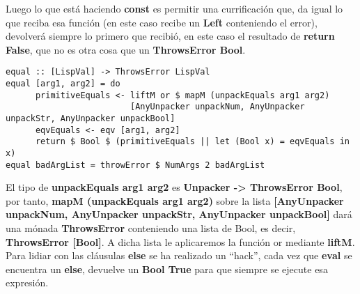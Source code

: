 Luego lo que est\'a haciendo \textbf{const} es permitir una currificaci\'on que, da igual lo que reciba esa funci\'on (en este caso recibe un \textbf{Left} conteniendo el error), devolver\'a siempre lo primero que recibi\'o, en este caso el resultado de \textbf{return False}, que no es otra cosa que un \textbf{ThrowsError Bool}.\\

\begin{minipage}{\linewidth}
\begin{small}
\begin{lstlisting}[frame=single]
equal :: [LispVal] -> ThrowsError LispVal
equal [arg1, arg2] = do
      primitiveEquals <- liftM or $ mapM (unpackEquals arg1 arg2) 
                         [AnyUnpacker unpackNum, AnyUnpacker unpackStr, AnyUnpacker unpackBool]
      eqvEquals <- eqv [arg1, arg2]
      return $ Bool $ (primitiveEquals || let (Bool x) = eqvEquals in x)
equal badArgList = throwError $ NumArgs 2 badArgList
\end{lstlisting}
\end{small}
\end{minipage}

El tipo de \textbf{unpackEquals arg1 arg2} es \textbf{Unpacker -> ThrowsError Bool}, por tanto, \textbf{mapM (unpackEquals arg1 arg2)} sobre la lista \textbf{[AnyUnpacker unpackNum, AnyUnpacker unpackStr, AnyUnpacker unpackBool]} dar\'a una m\'onada \textbf{ThrowsError} conteniendo una lista de Bool, es decir, \textbf{ThrowsError [Bool]}. A dicha lista le aplicaremos la funci\'on or mediante \textbf{liftM}.\\

Para lidiar con las cl\'ausulas \textbf{else} se ha realizado un ``hack'', cada vez que \textbf{eval} se encuentra un \textbf{else}, devuelve un \textbf{Bool True} para que siempre se ejecute esa expresi\'on.\\